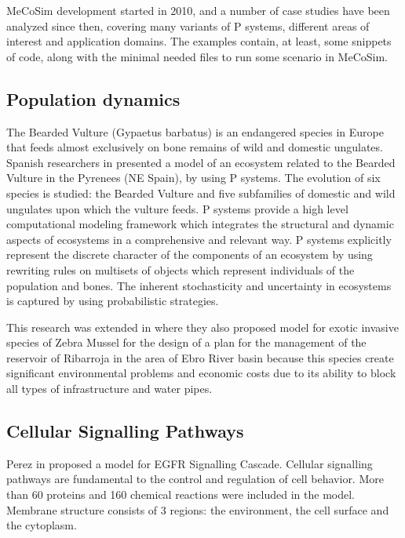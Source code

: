 MeCoSim development started in 2010, and a number of case studies have been analyzed since then, covering many variants of P systems, different areas of interest and application domains. The examples contain, at least, some snippets of code, along with the minimal needed files to run some scenario in MeCoSim.


\subsection{Population dynamics} %
\label{sub:population_dynamics}

The Bearded Vulture (Gypaetus barbatus) is an endangered species in Europe that feeds almost exclusively on bone remains of wild and domestic ungulates. Spanish researchers in \cite{Cardona:2009:Vultures} presented a model of an ecosystem related to the Bearded Vulture in the Pyrenees (NE Spain), by using P systems. The evolution of six species is studied: the Bearded Vulture and five subfamilies of domestic and wild ungulates upon which the vulture feeds. P systems provide a high level computational modeling framework which integrates the structural and dynamic aspects of ecosystems in a comprehensive and relevant way. P systems explicitly represent the discrete character of the components of an ecosystem by using rewriting rules on multisets of objects which represent individuals of the population and bones. The inherent stochasticity and uncertainty in ecosystems is captured by using probabilistic strategies.

This research was extended in \cite{Cardona11Zebra} where they also proposed model for exotic invasive species of Zebra Mussel for the design of a plan for the management of the reservoir of Ribarroja in the area of Ebro River basin because this species create significant environmental problems and economic costs due to its ability to block all types of infrastructure and water pipes.


\subsection{Cellular Signalling Pathways} %
\label{sub:cellular_signalling_pathways}

Perez in \cite{Perez06EGFR} proposed a model for EGFR Signalling Cascade. Cellular signalling pathways are fundamental to the control and regulation of cell behavior. More than 60 proteins and 160 chemical reactions were included in the model. Membrane structure consists of 3 regions: the environment, the cell surface and the cytoplasm. 

